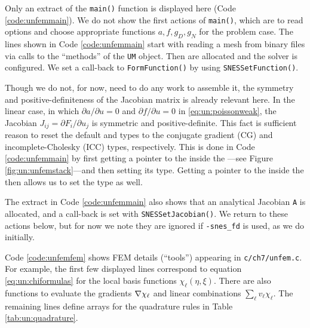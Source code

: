 
Only an extract of the \texttt{main()} function is displayed here (Code \ref{code:unfemmain}).  We do not show the first actions of \texttt{main()}, which are to read options and choose appropriate functions $a,f,g_D,g_N$ for the problem case.  The lines shown in Code \ref{code:unfemmain} start with reading a mesh from \PETSc binary files via calls to the ``methods'' of the \texttt{UM} object.  Then \pVecs are allocated and the \pSNES solver is configured.  We set a call-back to \texttt{FormFunction()} by using \texttt{SNESSetFunction()}.


Though we do not, for now, need to do any work to assemble it, the symmetry and positive-definiteness of the Jacobian matrix is already relevant here.  In the linear case, in which $\partial a/\partial u=0$ and $\partial f/\partial u=0$ in \eqref{eq:un:poissonweak}, the Jacobian $J_{ij} = \partial F_i/\partial u_j$ is symmetric and positive-definite.  This fact is sufficient reason to reset the default \pKSP and \pPC types to the conjugate gradient (CG) and incomplete-Cholesky (ICC) types, respectively.  This is done in Code \ref{code:unfemmain} by first getting a pointer to the \pKSP inside the \pSNES---see Figure \ref{fig:un:unfemstack}---and then setting its type.  Getting a pointer to the \pPC inside the \pKSP then allows us to set the \pPC type as well.

The extract in Code \ref{code:unfemmain} also shows that an analytical Jacobian \pMat \texttt{A} is allocated, and a \pSNES call-back is set with \texttt{SNESSetJacobian()}.  We return to these actions below, but for now we note they are ignored if \texttt{-snes\_fd} is used, as we do initially.


Code \ref{code:unfemfem} shows FEM details (``tools'') appearing in \texttt{c/ch7/unfem.c}.  For example, the first few displayed lines correspond to equation \eqref{eq:un:chiformulas} for the local basis functions $\chi_\ell(\eta,\xi)$.  There are also functions to evaluate the gradients $\nabla \chi_\ell$ and linear combinations $\sum_\ell v_\ell \chi_\ell$.  The remaining lines define arrays for the quadrature rules in Table \ref{tab:un:quadrature}.

